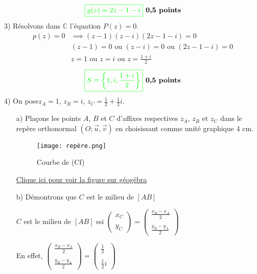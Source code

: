 \documentclass[12pt]{article}
\begin{document}
\[
\textcolor{green}{\boxed{ g(z)=2z-1-i }} \textbf{ 0,5 points}
\]
3) Résolvons dans \( \mathbb{C} \) l'équation \( P(z) = 0 \). \\

\begin{align*}
p(z)=0&\implies (z-1)(z-i)(2z-1-i)=0\\
&(z-1)=0 \text{ ou }(z-i)=0 \text{ ou } (2z-1-i)=0\\
&z=1 \text{ ou }z=i \text{ ou } z=\frac{1+i}{2}
\end{align*}
\[
\textcolor{green}{\boxed{ S=\left\lbrace 1,i,\frac{1+i}{2} \right\rbrace  }} \textbf{ 0,5 points}
\]
4) On pose\( z_A = 1 \), \( z_B = i \), \( z_C = \frac{1}{2}+\frac{1}{2}i \).
\begin{itemize}
\item[a)] Plaçons les points \( A \), \( B \) et \( C \) d'affixes respectives \( z_A\), \( z_B \) et \( z_C \) dans le repère orthonormal \( (O; \vec{u}, \vec{v}) \) en choisissant comme unité graphique 4 cm. \\ 
\newpage
\begin{figure}[h]
\centering
\texttt{[image: repère.png]}
\caption{Courbe de (Cf)}
\label{fig:monimage}
\end{figure}
\href{https://www.geogebra.org/classic/gh6vrrnw}{Clique ici pour voir la figure sur géogébra}

\item[b)] Démontrons que \( C \) est le milieu de \( [AB] \)

\( C \) est le milieu de \( [AB] \) ssi $\begin{pmatrix}x_{C} \\ \\ y_{C}\end{pmatrix}=
\begin{pmatrix}\frac{x_{B}-x_{A}}{2} \\ \\ \frac{y_{B}-y_{A}}{2}\end{pmatrix}$

En effet, $\begin{pmatrix}\frac{x_{B}-x_{A}}{2} \\ \\ \frac{y_{B}-y_{A}}{2}\end{pmatrix}=
\begin{pmatrix}\frac{1}{2} \\ \\ \frac{1}{2}i\end{pmatrix}$


\end{itemize}
\end{document}
